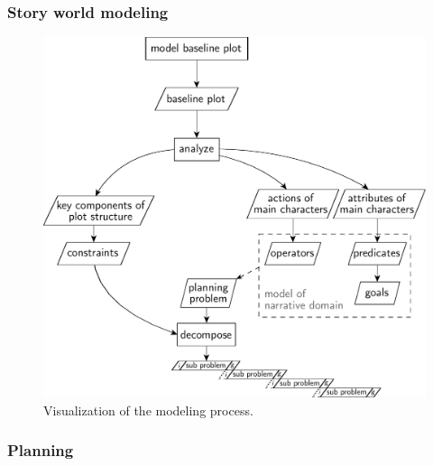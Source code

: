 \subsubsection{Story world modeling}
\begin{figure}[htbp]
 \centering
 \includegraphics[scale=0.6]{discourse_model}
 \caption{Visualization of the modeling process.}
 \label{fig:modproc}
\end{figure}
\subsubsection{Planning}
